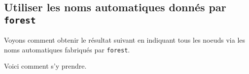 \documentclass[12pt,a4paper]{article}
\begin{document}

\subsection{Utiliser les noms automatiques donnés par \texttt{forest}} \label{tnsproba-autonum-forest}

Voyons comment obtenir le résultat suivant en indiquant tous les noeuds via les noms automatiques fabriqués par \verb#forest#.


%
%
%



Voici comment s'y prendre.
\end{document}
